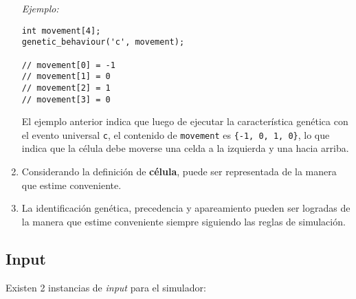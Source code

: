\documentclass[letterpaper,10pt]{article}
\begin{document}
\begin{enumerate}
	\emph{Ejemplo:}
	
\begin{lstlisting}
int movement[4];
genetic_behaviour('c', movement);

// movement[0] = -1
// movement[1] = 0
// movement[2] = 1
// movement[3] = 0
\end{lstlisting}

El ejemplo anterior indica que luego de ejecutar la característica genética con el evento universal \texttt{c}, el contenido de \texttt{movement} es \texttt{\{-1, 0, 1, 0\}}, lo que indica que la célula debe moverse una celda a la izquierda y una hacia arriba.


	\item Considerando la definición de \textbf{célula}, puede ser representada de la manera que estime conveniente.
	
	\item La identificación genética, precedencia y apareamiento pueden ser logradas de la manera que estime conveniente siempre siguiendo las reglas de simulación.
\end{enumerate}

\subsection{Input}
Existen 2 instancias de \emph{input} para el simulador:
\end{document}
